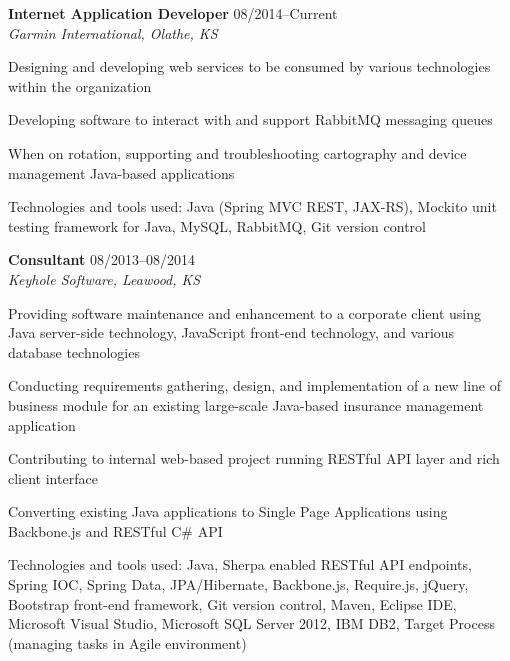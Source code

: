 \begin{itemize1}
	\item \textbf{Internet Application Developer} \textopenbullet{} 08/2014--Current \\
		\textit{Garmin International, Olathe, KS} \vspace{-1.5mm}
		\begin{itemize1}
			\item Designing and developing web services to be consumed by various technologies within the organization
			\item Developing software to interact with and support RabbitMQ messaging queues 
			\item When on rotation, supporting and troubleshooting cartography and device management Java-based applications
			\item Technologies and tools used: Java (Spring MVC REST, JAX-RS), Mockito unit testing framework for Java, MySQL, RabbitMQ, Git version control
		\end{itemize1}
\end{itemize1}

\begin{itemize1}
	\item \textbf{Consultant} \textopenbullet{} 08/2013--08/2014 \\
		\textit{Keyhole Software, Leawood, KS} \vspace{-1.5mm}
		\begin{itemize1}
			\item Providing software maintenance and enhancement to a corporate client using Java server-side technology, JavaScript front-end technology, and various database technologies
			\item Conducting requirements gathering, design, and implementation of a new line of business module for an existing large-scale Java-based insurance management application
			\item Contributing to internal web-based project running RESTful API layer and rich client interface
			\item Converting existing Java applications to Single Page Applications using Backbone.js and RESTful C\# API
			\item Technologies and tools used: Java, Sherpa enabled RESTful API endpoints, Spring IOC, Spring Data, JPA/Hibernate, Backbone.js, Require.js, jQuery, Bootstrap front-end framework, Git version control, Maven, Eclipse IDE, Microsoft Visual Studio, Microsoft SQL Server 2012, IBM DB2, Target Process (managing tasks in Agile environment)
		\end{itemize1}
\end{itemize1}

